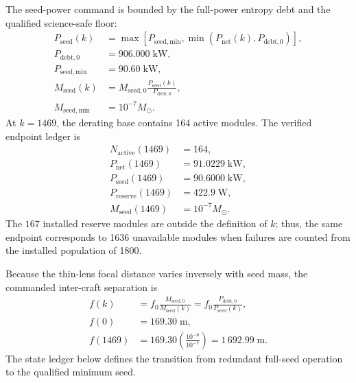\documentclass[10pt,twocolumn]{IEEEtran}
\newcommand{\Msun}{M_{\odot}}
\begin{document}
The seed-power command is bounded by the full-power entropy debt and the
qualified science-safe floor:
\begin{equation}
\begin{aligned}
P_{\mathrm{seed}}(k)
&=\max\!\left[P_{\mathrm{seed,min}},
\min\!\left(P_{\mathrm{net}}(k),P_{\mathrm{debt},0}\right)\right], \\
P_{\mathrm{debt},0}&=906.000\;\mathrm{kW}, \\
P_{\mathrm{seed,min}}&=90.60\;\mathrm{kW}, \\
M_{\mathrm{seed}}(k)
&=M_{\mathrm{seed},0}
\frac{P_{\mathrm{seed}}(k)}{P_{\mathrm{debt},0}}, \\
M_{\mathrm{seed,min}}&=10^{-7}\Msun.
\end{aligned}
\label{eq:seed_derating_law}
\end{equation}
At $k=1469$, the derating base contains 164 active modules.  The verified
endpoint ledger is
\begin{equation}
\begin{aligned}
N_{\mathrm{active}}(1469)&=164, \\
P_{\mathrm{net}}(1469)&=91.0229\;\mathrm{kW}, \\
P_{\mathrm{seed}}(1469)&=90.6000\;\mathrm{kW}, \\
P_{\mathrm{reserve}}(1469)&=422.9\;\mathrm{W}, \\
M_{\mathrm{seed}}(1469)&=10^{-7}\Msun.
\end{aligned}
\label{eq:derating_endpoint}
\end{equation}
The $167$ installed reserve modules are outside the definition of $k$;
thus, the same endpoint corresponds to 1636 unavailable modules when failures
are counted from the installed population of 1800.

Because the thin-lens focal distance varies inversely with seed mass, the
commanded inter-craft separation is
\begin{equation}
\begin{aligned}
f(k)&=f_0\frac{M_{\mathrm{seed},0}}{M_{\mathrm{seed}}(k)}
=f_0\frac{P_{\mathrm{debt},0}}{P_{\mathrm{seed}}(k)}, \\
f(0)&=169.30\;\mathrm{m}, \\
f(1469)&=169.30\left(\frac{10^{-6}}{10^{-7}}\right)
=1\,692.99\;\mathrm{m}.
\end{aligned}
\label{eq:derated_focal_distance}
\end{equation}
The state ledger below defines the transition from redundant full-seed
operation to the qualified minimum seed.
\end{document}
